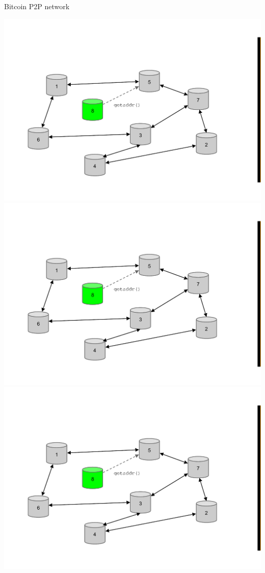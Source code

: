\begin{frame}{Bitcoin P2P network}
\begin{overprint}
\includegraphics[width=\textwidth,page=1]{p2p-join}
\includegraphics[width=\textwidth,page=2]{p2p-join}
\includegraphics[width=\textwidth,page=3]{p2p-join}

\end{overprint}
\end{frame}
